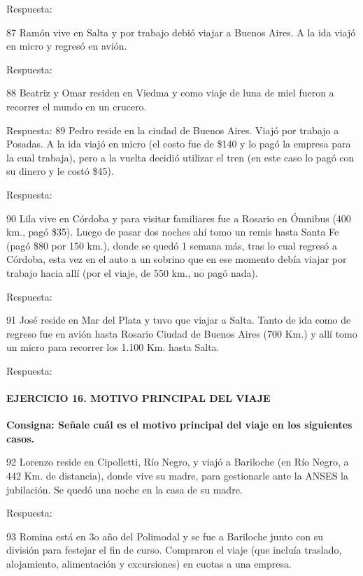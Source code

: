 \documentclass[
  openany]{book}
\begin{document}
Respuesta:

87 Ramón vive en Salta y por trabajo debió viajar a Buenos Aires. A la ida viajó en micro y regresó en avión.

Respuesta:

88 Beatriz y Omar residen en Viedma y como viaje de luna de miel fueron a recorrer el mundo en un crucero.

Respuesta: 89 Pedro reside en la ciudad de Buenos Aires. Viajó por trabajo a Posadas. A la ida viajó en micro (el costo fue de \$140 y lo pagó la empresa para la cual trabaja), pero a la vuelta decidió utilizar el tren (en este caso lo pagó con su dinero y le costó \$45).

Respuesta:

90 Lila vive en Córdoba y para visitar familiares fue a Rosario en Ómnibus (400 km., pagó \$35). Luego de pasar dos noches ahí tomo un remis hasta Santa Fe (pagó \$80 por 150 km.), donde se quedó 1 semana más, tras lo cual regresó a Córdoba, esta vez en el auto a un sobrino que en ese momento debía viajar por trabajo hacia allí (por el viaje, de 550 km., no pagó nada).

Respuesta:

91 José reside en Mar del Plata y tuvo que viajar a Salta. Tanto de ida como de regreso fue en avión hasta Rosario Ciudad de Buenos Aires (700 Km.) y allí tomo un micro para recorrer los 1.100 Km. hasta Salta.

Respuesta:

\hypertarget{ejercicio-16.-motivo-principal-del-viaje}{%
\paragraph{\texorpdfstring{\textbf{EJERCICIO 16. MOTIVO PRINCIPAL DEL VIAJE}}{EJERCICIO 16. MOTIVO PRINCIPAL DEL VIAJE}}\label{ejercicio-16.-motivo-principal-del-viaje}}

\textbf{Consigna: Señale cuál es el motivo principal del viaje en los siguientes casos.}

92 Lorenzo reside en Cipolletti, Río Negro, y viajó a Bariloche (en Río Negro, a 442 Km. de distancia), donde vive su madre, para gestionarle ante la ANSES la jubilación. Se quedó una noche en la casa de su madre.

Respuesta:

93 Romina está en 3o año del Polimodal y se fue a Bariloche junto con su división para festejar el fin de curso. Compraron el viaje (que incluía traslado, alojamiento, alimentación y excursiones) en cuotas a una empresa.
\end{document}
